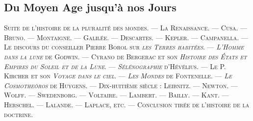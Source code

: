 \documentclass[a4paper, 11pt, oneside]{article}
\begin{document}
\subsection{Du Moyen Age jusqu'à nos Jours}
\begin{center}
\scshape
\small
Suite de l'histoire de la pluralité des mondes. --- La Renaissance. --- Cusa. --- Bruno. --- Montaigne. --- Galilée. --- Descartes. --- Kepler. --- Campanella. --- Le discours du conseiller Pierre Borol sur \emph{les Terres habitées}. --- \emph{L'Homme dans la lune} de Godwin. --- Cyrano de Bergerac et son \emph{Histoire des États et Empires du Soleil et de la Lune}. --- \emph{Sélénographie} d'Hévélius. --- Le P. Kircher et son \emph{Voyage dans le ciel}. --- \emph{Les Mondes} de Fontenelle. --- \emph{Le Cosmotheôros} de Huygens. --- Dix-huitième siècle : Leibnitz. --- Newton. --- Wolff. --- Swedenborg. --- Voltaire. --- Lambert. --- Bailly. --- Kant. --- Herschel. --- Lalande. --- Laplace, etc. --- Conclusion tirée de l'histoire de la doctrine.
\end{center}
\end{document}
